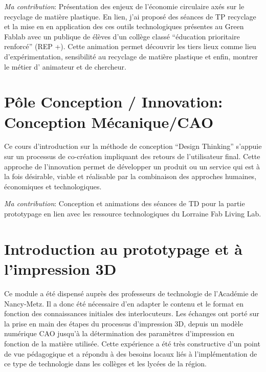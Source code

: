 \documentclass[
  12pt,
  oneside]{book}
\begin{document}
\emph{Ma contribution}: Présentation des enjeux de l'économie circulaire axés sur le recyclage de matière plastique. En lien, j'ai proposé des séances de TP recyclage et la mise en en application des ces outils technologiques présentes au Green Fablab avec un publique de élèves d'un collège classé ``éducation prioritaire renforcé'' (REP +). Cette animation permet découvrir les tiers lieux comme lieu d'expérimentation, sensibilité au recyclage de matière plastique et enfin, montrer le métier d' animateur et de chercheur.

\hypertarget{puxf4le-conception-innovation-conception-muxe9caniquecao}{%
\section{Pôle Conception / Innovation: Conception Mécanique/CAO}\label{puxf4le-conception-innovation-conception-muxe9caniquecao}}

Ce cours d'introduction sur la méthode de conception ``Design Thinking'' s'appuie sur un processus de co-création impliquant des retours de l'utilisateur final.
Cette approche de l'innovation permet de développer un produit ou un service qui est à la fois désirable, viable et réalisable par la combinaison des approches humaines, économiques et technologiques.

\emph{Ma contribution}: Conception et animations des séances de TD pour la partie prototypage en lien avec les ressource technologiques du Lorraine Fab Living Lab.

\hypertarget{introduction-au-prototypage-et-uxe0-limpression-3d}{%
\section{Introduction au prototypage et à l'impression 3D}\label{introduction-au-prototypage-et-uxe0-limpression-3d}}

Ce module a été dispensé auprès des professeurs de technologie de l'Académie de Nancy-Metz. Il a donc été nécessaire d'en adapter le contenu et le format en fonction des connaissances initiales des interlocuteurs. Les échanges ont porté sur la prise en main des étapes du processus d'impression 3D, depuis un modèle numérique CAO jusqu'à la détermination des paramètres d'impression en fonction de la matière utilisée.
Cette expérience a été très constructive d'un point de vue pédagogique et a répondu à des besoins locaux liés à l'implémentation de ce type de technologie dans les collèges et les lycées de la région.
\end{document}
